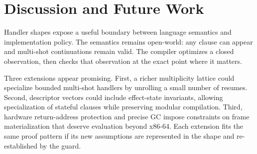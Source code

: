 \section{Discussion and Future Work}
\label{sec:discussion}

Handler shapes expose a useful boundary between language semantics and
implementation policy. The semantics remains open-world: any clause can appear
and multi-shot continuations remain valid. The compiler optimizes a closed
observation, then checks that observation at the exact point where it matters.

Three extensions appear promising. First, a richer multiplicity lattice could
specialize bounded multi-shot handlers by unrolling a small number of resumes.
Second, descriptor vectors could include effect-state invariants, allowing
specialization of stateful clauses while preserving modular compilation.
Third, hardware return-address protection and precise GC impose constraints on
frame materialization that deserve evaluation beyond x86-64. Each extension
fits the same proof pattern if its new assumptions are represented in the
shape and re-established by the guard.

